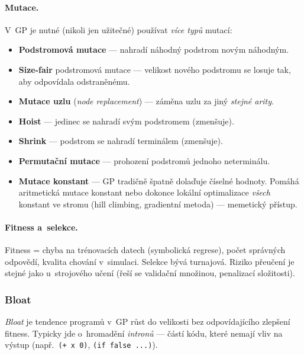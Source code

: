 \documentclass[11pt,a4paper]{article}
\theoremstyle{definition}
\begin{document}
\paragraph{Mutace.} V~GP je nutné (nikoli jen užitečné) používat \emph{více
typů} mutací:
\begin{itemize}
\item \textbf{Podstromová mutace} --- nahradí náhodný podstrom novým náhodným.
\item \textbf{Size-fair} podstromová mutace --- velikost nového podstromu se
  losuje tak, aby odpovídala odstraněnému.
\item \textbf{Mutace uzlu} (\emph{node replacement}) --- záměna uzlu za jiný
  \emph{stejné arity}.
\item \textbf{Hoist} --- jedinec se nahradí svým podstromem (zmenšuje).
\item \textbf{Shrink} --- podstrom se nahradí terminálem (zmenšuje).
\item \textbf{Permutační mutace} --- prohození podstromů jednoho neterminálu.
\item \textbf{Mutace konstant} --- GP tradičně špatně dolaďuje číselné hodnoty.
  Pomáhá aritmetická mutace konstant nebo dokonce lokální optimalizace
  \emph{všech} konstant ve stromu (hill climbing, gradientní metoda) ---
  memetický přístup.
\end{itemize}

\paragraph{Fitness a~selekce.} Fitness = chyba na trénovacích datech
(symbolická regrese), počet správných odpovědí, kvalita chování v~simulaci.
Selekce bývá turnajová. Riziko přeučení je stejné jako u~strojového učení
(řeší se validační množinou, penalizací složitosti).

\subsubsection{Bloat}

\begin{defbox}[Bloat]
\emph{Bloat} je tendence programů v~GP růst do velikosti bez odpovídajícího
zlepšení fitness. Typicky jde o~hromadění \emph{intronů} --- částí kódu, které
nemají vliv na výstup (např.\ \texttt{(+ x 0)}, \texttt{(if false ...)}).
\end{defbox}
\end{document}
